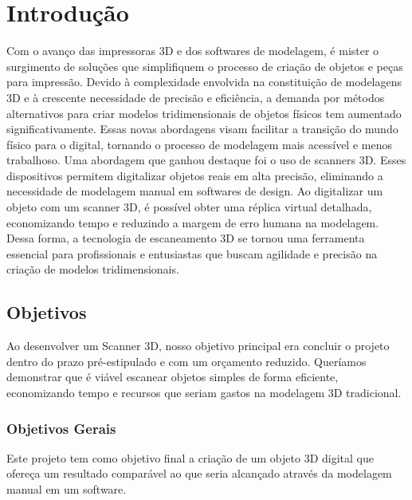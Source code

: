
\chapter{Introdução}\label{cap:introducao}

Com o avanço das impressoras 3D e dos softwares de modelagem, é mister o surgimento de soluções que simplifiquem o processo de criação de objetos e peças para impressão. Devido à complexidade envolvida na constituição de modelagens 3D e à crescente necessidade de precisão e eficiência, a demanda por métodos alternativos para criar modelos tridimensionais de objetos físicos tem aumentado significativamente. Essas novas abordagens visam facilitar a transição do mundo físico para o digital, tornando o processo de modelagem mais acessível e menos trabalhoso.
Uma abordagem que ganhou destaque foi o uso de scanners 3D. Esses dispositivos permitem digitalizar objetos reais em alta precisão, eliminando a necessidade de modelagem manual em softwares de design. Ao digitalizar um objeto com um scanner 3D, é possível obter uma réplica virtual detalhada, economizando tempo e reduzindo a margem de erro humana na modelagem. Dessa forma, a tecnologia de escaneamento 3D se tornou uma ferramenta essencial para profissionais e entusiastas que buscam agilidade e precisão na criação de modelos tridimensionais.

\section{Objetivos}
Ao desenvolver um Scanner 3D, nosso objetivo principal era concluir o projeto dentro do prazo pré-estipulado e com um orçamento reduzido. Queríamos demonstrar que é viável escanear objetos simples de forma eficiente, economizando tempo e recursos que seriam gastos na modelagem 3D tradicional.

\subsection{Objetivos Gerais}

Este projeto tem como objetivo final a criação de um objeto 3D digital que ofereça um resultado comparável ao que seria alcançado através da modelagem manual em um software.

